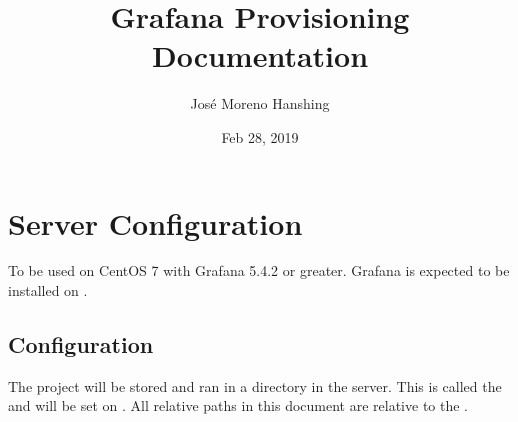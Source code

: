 \documentclass[letterpaper,10pt,english]{sphinxmanual}
\title{Grafana Provisioning Documentation}
\date{Feb 28, 2019}
\author{José Moreno Hanshing}
\begin{document}
\pagestyle{empty}
\sphinxmaketitle
\pagestyle{plain}
\sphinxtableofcontents
\pagestyle{normal}
\label{\detokenize{index::doc}}



\chapter{Server Configuration}
\label{\detokenize{readme:server-configuration}}\label{\detokenize{readme::doc}}
To be used on CentOS 7 with Grafana 5.4.2 or greater. Grafana is expected to be
installed on .


\section{Configuration}
\label{\detokenize{readme:configuration}}\label{\detokenize{readme:id1}}
The project will be stored and ran in a directory in the server. This is called
the  and will be set on {\hyperref[\detokenize{readme:r4}]{}}. All
relative paths in this document are relative to the .
\end{document}

